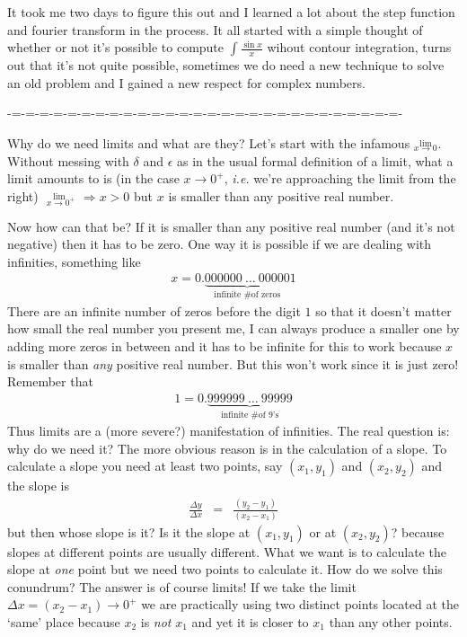\documentclass[aps,preprint,preprintnumbers,nofootinbib,showpacs,prd]{revtex4-1}
\newcommand{\msout}[1]{\text{\sout{\ensuremath{#1}}}}
\newcommand{\ie}{{\it i.e.} }
\newcommand{\nbea}{\begin{eqnarray*}}
\newcommand{\neea}{\end{eqnarray*}}
\begin{document}
It took me two days to figure this out and I learned a lot about the step function and fourier transform in the process. It all started with a simple thought of whether or not it's possible to compute $\int \frac{\sin x}{x}$ wihout contour integration, turns out that it's not quite possible, sometimes we do need a new technique to solve an old problem and I gained a new respect for complex numbers.



-=-=-=-=-=-=-=-=-=-=-=-=-=-=-=-=-=-=-=-=-=-=-=-=-=-=-=-=-

Why do we need limits and what are they? Let's start with the infamous $\stackrel{\mbox{lim}}{_{x \to 0}}$. Without messing with $\delta$ and $\epsilon$ as in the usual formal definition of a limit, what a limit amounts to is (in the case $x \to 0^{+}$, \ie we're approaching the limit from the right) $\stackrel{\mbox{lim}}{_{~~x \to 0^+}}$ $\Rightarrow x > 0$ but $x$ is smaller than any positive real number.

Now how can that be? If it is smaller than any positive real number (and it's not negative) then it has to be zero. One way it is possible if we are dealing with infinities, something like 
%
\nbea
x = 0.\underbrace{000000 ~\dots ~ 00000}_\text{infinite \# of zeros}1
\neea
%
There are an infinite number of zeros before the digit $1$ so that it doesn't matter how small the real number you present me, I can always produce a smaller one by adding more zeros in between and it has to be infinite for this to work because $x$ is smaller than {\it any} positive real number. But this won't work since it is just zero! Remember that
%
\nbea
1 = 0.\underbrace{999999 ~\dots~ 99999}_\text{infinite \# of 9's}
\neea
%
Thus limits are a (more severe?) manifestation of infinities. The real question is: why do we need it? The more obvious reason is in the calculation of a slope. To calculate a slope you need at least two points, say $(x_1, y_1)$ and $(x_2, y_2)$ and the slope is
%
\nbea
\frac{\Delta y}{\Delta x} & = & \frac{(y_2 -y_1)}{(x_2 - x_1)}
\neea
%
but then whose slope is it? Is it the slope at $(x_1, y_1)$ or at $(x_2, y_2)$? because slopes at different points are usually different. What we want is to calculate the slope at {\it one} point but we need two points to calculate it. How do we solve this conundrum? The answer is of course limits! If we take the limit $\Delta x = (x_2 - x_1) \to 0^+$ we are practically using two distinct points located at the `same' place because $x_2$ is {\it not} $x_1$ and yet it is closer to $x_1$ than any other points.
\end{document}
